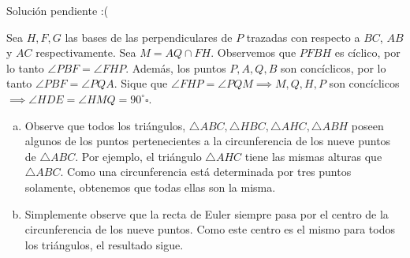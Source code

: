 \begin{sol}
	Soluci\'on pendiente :(
\end{sol}

\begin{sol}
	Sea $H, F, G$ las bases de las perpendiculares de $P$ trazadas con respecto a $BC$, $AB$ y $AC$ respectivamente. Sea $M = AQ \cap FH$. Observemos que $PFBH$ es c\'iclico, por lo tanto $\angle PBF = \angle FHP$. Adem\'as, los puntos $P, A, Q, B$ son conc\'iclicos, por lo tanto $\angle PBF = \angle PQA$. Sique que $\angle FHP = \angle PQM \implies M, Q, H, P $ son conc\'iclicos $\implies \angle HDE = \angle HMQ = 90^{\circ}\square$.
\end{sol}

\begin{sol}
	\begin{enumerate}[a.]
		\item Observe que todos los tri\'angulos, $\triangle ABC,\triangle HBC,\triangle AHC,\triangle ABH$ poseen algunos  de los puntos pertenecientes a la circunferencia de los nueve puntos de $\triangle ABC$. Por ejemplo, el tri\'angulo $\triangle AHC$ tiene las mismas alturas que $\triangle ABC$. Como una circunferencia est\'a determinada por tres puntos solamente, obtenemos que todas ellas son la misma. 
		\item Simplemente observe que la recta de Euler siempre pasa por el centro de la circunferencia de los nueve puntos. Como este centro es el mismo para todos los tri\'angulos, el resultado sigue.
	\end{enumerate}
\end{sol}